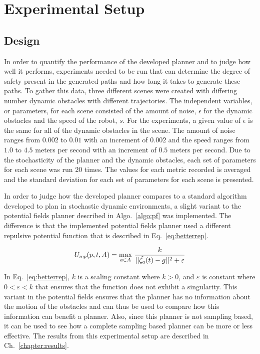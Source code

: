 


\chapter{Experimental Setup}

\label{chapter:experimentalsetup}

\section{Design}

In order to quantify the performance of the developed planner and to judge how
well it performs, experiments needed to be run that can determine the degree of
safety present in the generated paths and how long it takes to generate these
paths. To gather this data, three different scenes were created with differing
number dynamic obstacles with different trajectories. The independent
variables, or parameters, for each scene consisted of the amount of noise,
$\epsilon$ for the dynamic obstacles and the speed of the robot, $s$. For the
experiments, a given value of $\epsilon$ is the same for all of the dynamic
obstacles in the scene. The amount of noise ranges from $0.002$ to $0.01$ with
an increment of $0.002$ and the speed ranges from $1.0$ to $4.5$ meters per
second with an increment of $0.5$ meters per second. Due to the stochasticity
of the planner and the dynamic obstacles, each set of parameters for each scene
was run 20 times. The values for each metric recorded is averaged and the
standard deviation for each set of parameters for each scene is presented.

In order to judge how the developed planner compares to a standard algorithm
developed to plan in stochastic dynamic environments, a slight variant to the
potential fields planner described in Algo.~\ref{algo:pf} was implemented. The
difference is that the implemented potential fields planner used a different
repulsive potential function that is described in Eq.~\ref{eq:betterrep}.

\begin{equation}
    U_{\Var{rep}}(p, t, A) = \max_{a \in A} \,
    \frac{k}{||\tilde{\zeta_a}(t) - g||^2 + \varepsilon}
    \label{eq:betterrep}
\end{equation}

In Eq.~\ref{eq:betterrep}, $k$ is a scaling constant where $k > 0$, and
$\varepsilon$ is constant where $0 < \varepsilon < k$ that ensures that the
function does not exhibit a singularity. This variant in the potential fields
ensures that the planner has no information about the motion of the obstacles
and can thus be used to compare how this information can benefit a planner.
Also, since this planner is not sampling based, it can be used to see how a
complete sampling based planner can be more or less effective. The results from
this experimental setup are described in Ch.~\ref{chapter:results}.

